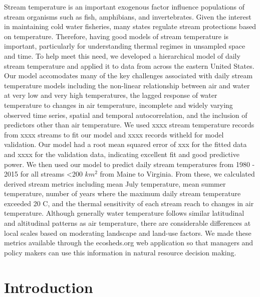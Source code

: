 Stream temperature is an important exogenous factor influence
populations of stream organisms such as fish, amphibians, and
invertebrates. Given the interest in maintaining cold water fisheries,
many states regulate stream protections based on temperature. Therefore,
having good models of stream temperature is important, particularly for
understanding thermal regimes in unsampled space and time. To help meet
this need, we developed a hierarchical model of daily stream temperature
and applied it to data from across the eastern United States. Our model
accomodates many of the key challenges associated with daily stream
temperature models including the non-linear relationship between air and
water at very low and very high temperatures, the lagged response of
water temperature to changes in air temperature, incomplete and widely
varying observed time series, spatial and temporal autocorrelation, and
the inclusion of predictors other than air temperature. We used xxxx
stream temperature records from xxxx streams to fit our model and xxxx
records witheld for model validation. Our model had a root mean squared
error of xxx for the fitted data and xxxx for the validation data,
indicating excellent fit and good predictive power. We then used our
model to predict daily stream temperatures from 1980 - 2015 for all
streams \textless{}200 \(km^2\) from Maine to Virginia. From these, we
calculated derived stream metrics including mean July temperature, mean
summer temperature, number of years where the maximum daily stream
temperature exceeded 20 C, and the thermal sensitivity of each stream
reach to changes in air temperature. Although generally water
temperature follows similar latitudinal and altitudinal patterns as air
temperature, there are considerable differences at local scales based on
moderating landscape and land-use factors. We made these metrics
available through the ecosheds.org web application so that managers and
policy makers can use this information in natural resource decision
making.

\section{Introduction}\label{introduction}

